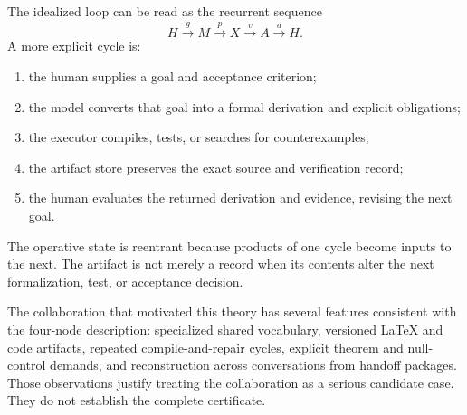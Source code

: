 The idealized loop can be read as the recurrent sequence
\[
\boxed{
H\xrightarrow{g}M
\xrightarrow{p}X
\xrightarrow{v}A
\xrightarrow{d}H.
}
\]
A more explicit cycle is:
\begin{enumerate}
\item the human supplies a goal and acceptance criterion;
\item the model converts that goal into a formal derivation and explicit
 obligations;
\item the executor compiles, tests, or searches for counterexamples;
\item the artifact store preserves the exact source and verification record;
\item the human evaluates the returned derivation and evidence, revising the
 next goal.
\end{enumerate}
The operative state is reentrant because products of one cycle become inputs to
the next. The artifact is not merely a record when its contents alter the next
formalization, test, or acceptance decision.


The collaboration that motivated this theory has several features consistent
with the four-node description: specialized shared vocabulary, versioned
LaTeX and code artifacts, repeated compile-and-repair cycles, explicit theorem
and null-control demands, and reconstruction across conversations from handoff
packages. Those observations justify treating the collaboration as a serious
candidate case. They do not establish the complete certificate.

